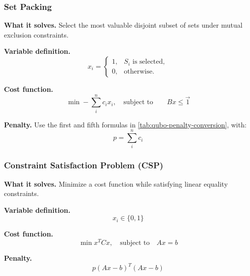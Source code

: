 \newpage

\subsubsection{Set Packing}

\textcolor{Green3}{ \textbf{What it solves.}} Select the most valuable disjoint subset of sets under mutual exclusion constraints.

\highspace
\textcolor{Green3}{ \textbf{Variable definition.}}
\begin{equation*}
    x_i=
    \begin{cases}
        1, & S_i\text{ is selected},\\
        0, & \text{otherwise}.
    \end{cases}
\end{equation*}

\highspace
\textcolor{Red2}{ \textbf{Cost function.}}
\begin{equation}\label{eq:qubo-set-packing}
    \min -\sum_{i}^{n}c_ix_i,\quad \text{subject to}\qquad Bx\leq\vec{1}
\end{equation}

\highspace
\textcolor{Red2}{ \textbf{Penalty.}} Use the first and fifth formulas in \autoref{tab:qubo-penalty-conversion}, with:
\begin{equation}\label{eq:qubo-set-packing-penalty}
    p=\sum_{i}^{n}c_i
\end{equation}

\longline

\subsubsection{Constraint Satisfaction Problem (CSP)}

\textcolor{Green3}{ \textbf{What it solves.}} Minimize a cost function while satisfying linear equality constraints.

\highspace
\textcolor{Green3}{ \textbf{Variable definition.}}
\begin{equation*}
    x_i\in\{0,1\}
\end{equation*}

\highspace
\textcolor{Red2}{ \textbf{Cost function.}}
\begin{equation}\label{eq:qubo-csp-cost}
    \min x^{T}Cx,\quad \text{subject to}\quad Ax=b
\end{equation}

\highspace
\textcolor{Red2}{ \textbf{Penalty.}}
\begin{equation}\label{eq:qubo-csp-penalty}
    p(Ax-b)^{T}(Ax-b)
\end{equation}
